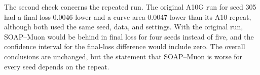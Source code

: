 The second check concerns the repeated run. The original A10G run for seed 305
had a final loss 0.0046 lower and a curve area 0.0047 lower than its A10
repeat, although both used the same seed, data, and settings. With the original
run, SOAP--Muon would be behind in final loss for four seeds instead of five,
and the confidence interval for the final-loss difference would include zero.
The overall conclusions are unchanged, but the statement that SOAP--Muon is
worse for every seed depends on the repeat.


